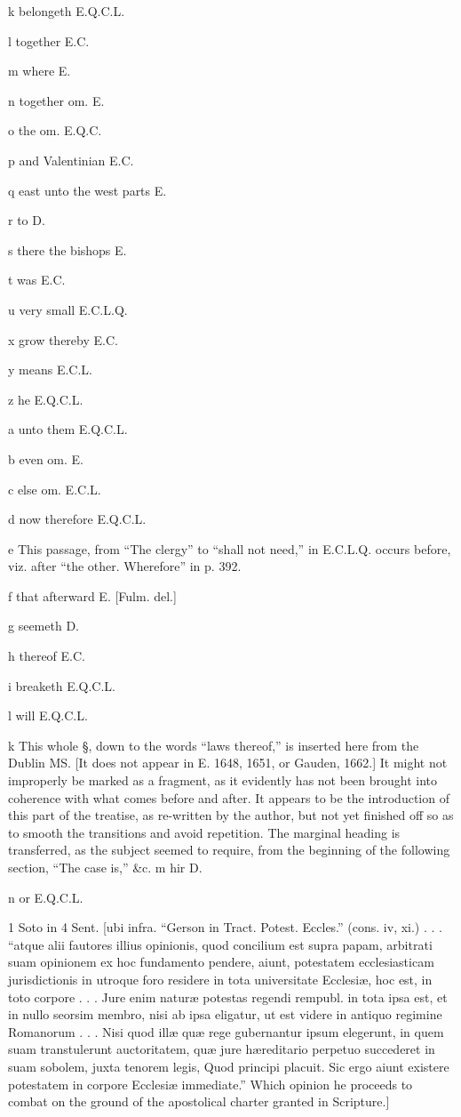 k
belongeth E.Q.C.L.

l
together E.C.

m
where E.

n
together om. E.

o
the om. E.Q.C.

p
and Valentinian E.C.

q
east unto the west parts E.

r
to D.

s
there the bishops E.

t
was E.C.

u
very small E.C.L.Q.

x
grow thereby E.C.

y
means E.C.L.

z
he E.Q.C.L.

a
unto them E.Q.C.L.

b
even om. E.

c
else om. E.C.L.

d
now therefore E.Q.C.L.

e
This passage, from “The clergy” to “shall not need,” in E.C.L.Q. occurs before, viz. after “the other. Wherefore” in p. 392.

f
that afterward E. [Fulm. del.]

g
seemeth D.

h
thereof E.C.

i
breaketh E.Q.C.L.

l
will E.Q.C.L.

k This whole §, down to the words “laws thereof,” is inserted here from the Dublin MS. [It does not appear in E. 1648, 1651, or Gauden, 1662.] It might not improperly be marked as a fragment, as it evidently has not been brought into coherence with what comes before and after. It appears to be the introduction of this part of the treatise, as re-written by the author, but not yet finished off so as to smooth the transitions and avoid repetition. The marginal heading is transferred, as the subject seemed to require, from the beginning of the following section, “The case is,” &c.
m
hir D.

n
or E.Q.C.L.

1
Soto in 4 Sent. [ubi infra. “Gerson in Tract. Potest. Eccles.” (cons. iv, xi.) . . . “atque alii fautores illius opinionis, quod concilium est supra papam, arbitrati suam opinionem ex hoc fundamento pendere, aiunt, potestatem ecclesiasticam jurisdictionis in utroque foro residere in tota universitate Ecclesiæ, hoc est, in toto corpore . . . Jure enim naturæ potestas regendi rempubl. in tota ipsa est, et in nullo seorsim membro, nisi ab ipsa eligatur, ut est videre in antiquo regimine Romanorum . . . Nisi quod illæ quæ rege gubernantur ipsum elegerunt, in quem suam transtulerunt auctoritatem, quæ jure hæreditario perpetuo succederet in suam sobolem, juxta tenorem legis, Quod principi placuit. Sic ergo aiunt existere potestatem in corpore Ecclesiæ immediate.” Which opinion he proceeds to combat on the ground of the apostolical charter granted in Scripture.]

